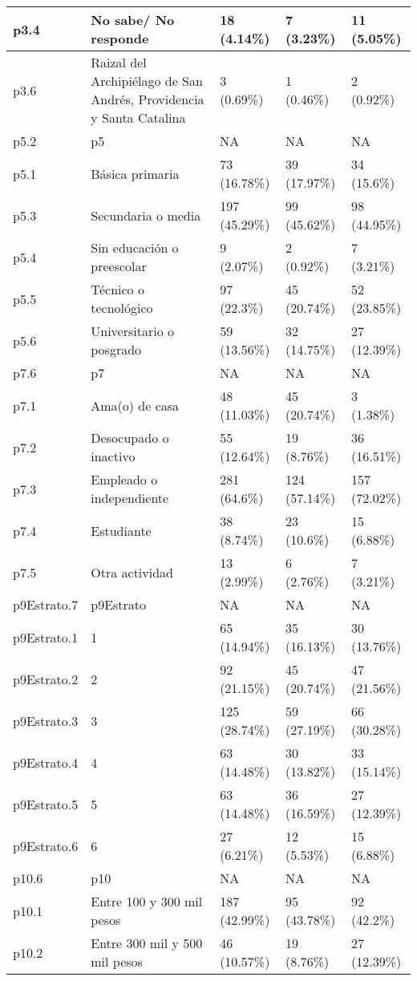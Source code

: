 \begin{table}
{\begin{tabular}[t]{l|l|l|l|l}
\hline
p3.4 & No sabe/ No responde & 18 (4.14\%) & 7 (3.23\%) & 11 (5.05\%)\\
\hline
p3.6 & Raizal del Archipiélago de San Andrés, Providencia y Santa Catalina & 3 (0.69\%) & 1 (0.46\%) & 2 (0.92\%)\\
\hline
p5.2 & p5 & NA & NA & NA\\
\hline
p5.1 & Básica primaria & 73 (16.78\%) & 39 (17.97\%) & 34 (15.6\%)\\
\hline
p5.3 & Secundaria o media & 197 (45.29\%) & 99 (45.62\%) & 98 (44.95\%)\\
\hline
p5.4 & Sin educación o preescolar & 9 (2.07\%) & 2 (0.92\%) & 7 (3.21\%)\\
\hline
p5.5 & Técnico o tecnológico & 97 (22.3\%) & 45 (20.74\%) & 52 (23.85\%)\\
\hline
p5.6 & Universitario o posgrado & 59 (13.56\%) & 32 (14.75\%) & 27 (12.39\%)\\
\hline
p7.6 & p7 & NA & NA & NA\\
\hline
p7.1 & Ama(o) de casa & 48 (11.03\%) & 45 (20.74\%) & 3 (1.38\%)\\
\hline
p7.2 & Desocupado o inactivo & 55 (12.64\%) & 19 (8.76\%) & 36 (16.51\%)\\
\hline
p7.3 & Empleado o independiente & 281 (64.6\%) & 124 (57.14\%) & 157 (72.02\%)\\
\hline
p7.4 & Estudiante & 38 (8.74\%) & 23 (10.6\%) & 15 (6.88\%)\\
\hline
p7.5 & Otra actividad & 13 (2.99\%) & 6 (2.76\%) & 7 (3.21\%)\\
\hline
p9Estrato.7 & p9Estrato & NA & NA & NA\\
\hline
p9Estrato.1 & 1 & 65 (14.94\%) & 35 (16.13\%) & 30 (13.76\%)\\
\hline
p9Estrato.2 & 2 & 92 (21.15\%) & 45 (20.74\%) & 47 (21.56\%)\\
\hline
p9Estrato.3 & 3 & 125 (28.74\%) & 59 (27.19\%) & 66 (30.28\%)\\
\hline
p9Estrato.4 & 4 & 63 (14.48\%) & 30 (13.82\%) & 33 (15.14\%)\\
\hline
p9Estrato.5 & 5 & 63 (14.48\%) & 36 (16.59\%) & 27 (12.39\%)\\
\hline
p9Estrato.6 & 6 & 27 (6.21\%) & 12 (5.53\%) & 15 (6.88\%)\\
\hline
p10.6 & p10 & NA & NA & NA\\
\hline
p10.1 & Entre 100 y 300 mil pesos & 187 (42.99\%) & 95 (43.78\%) & 92 (42.2\%)\\
\hline
p10.2 & Entre 300 mil y 500 mil pesos & 46 (10.57\%) & 19 (8.76\%) & 27 (12.39\%)\\

\end{tabular}}
\end{table}
